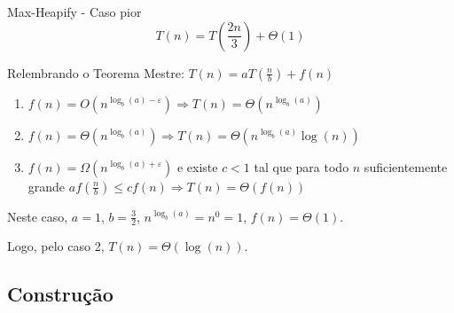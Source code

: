 \documentclass[t, 10pt]{beamer}
\begin{document}
  \begin{frame}{Max-Heapify - Caso pior}
    $$T(n) = T\left(\frac{2n}{3}\right) + \Theta(1)$$
    
    Relembrando o Teorema Mestre: $T(n) = aT\left(\frac{n}{b}\right) + f(n)$
    
    \begin{enumerate}
      \item $f(n) = O(n^{\log_b(a) - \varepsilon}) \Rightarrow T(n) = \Theta(n^{\log_b(a)})$
      \item $f(n) = \Theta(n^{\log_b(a)}) \Rightarrow T(n) = \Theta(n^{\log_b(a)}\log(n))$
      \item $f(n) = \Omega(n^{\log_b(a) + \varepsilon})$ e existe $c < 1$ tal que para todo $n$
      suficientemente grande $af\left(\frac{n}{b}\right) \leq cf(n) \Rightarrow T(n) = \Theta(f(n))$
    \end{enumerate}

    \pause
    \vspace{2em}

    Neste caso, $a = 1$, $b = \frac{3}{2}$, $n^{\log_b(a)} = n^0 = 1$, $f(n) = \Theta(1)$.
    
    Logo, pelo caso 2, $T(n) = \Theta(\log(n))$.
  \end{frame}

  \subsection{Construção}
  
\end{document}
